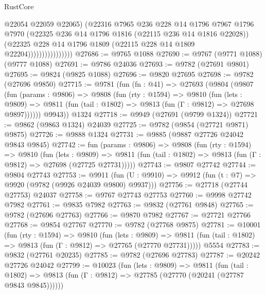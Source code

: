 \begin{lexlean}{RustCore}
\begin{coremodule}
                                @22054
                                @22059
                                @22065)
                              (@22316
                                @7965
                                @236
                                @228
                                @14
                                @1796
                                @7967
                                @1796
                                @7970
                                (@22325 @236 @14 @1796 @1816 (@22115 @236 @14 @1816 @22028))
                                (@22325
                                  @228
                                  @14
                                  @1796
                                  @1809
                                  (@22115 @228 @14 @1809 @22204))))))))))))))))
@27686 := @9765 @1088
@27690 := @9767 (@9771 @1088) (@9777 @1088)
@27691 := @9786 @24036
@27693 := @9782 (@27691 @9801)
@27695 := @9824 (@9825 @1088)
@27696 := @9820 @27695
@27698 := @9782 (@27696 @9850)
@27715 := @9781
    (fun (fn : @41) =>
    @27693
      (@9804
        (@9807
          (fun (params : @9806) =>
          @9808
            (fun (rty : @1594) =>
            @9810
              (fun (lets : @9809) =>
              @9811 (fun (tail : @1802) => @9813 (fun (Γ : @9812) => @27698 @9897))))))
        @9943))
    @1324
@27718 := @9949 (@27691 (@9799 @1324))
@27721 := @9862 (@9863 @1324) @24039
@27725 := @9782 (@9854 (@27721 @9871) @9875)
@27726 := @9888 @1324
@27731 := @9885 (@9887 @27726 @24042 @9843 @9845)
@27742 := fun (params : @9806) =>
  @9808
    (fun (rty : @1594) =>
    @9810
      (fun (lets : @9809) =>
      @9811 (fun (tail : @1802) => @9813 (fun (Γ : @9812) => @27698 (@27725 @27731)))))
@27743 := @9807 @27742
@27744 := @9804 @27743
@27753 := @9911
    (fun (U : @9910) => @9912 (fun (t : @7) => @9920 (@9782 (@9926 @24039 @9800) @9937)))
@27756 := @27718 (@27744 @27753) @24037
@27758 := @9767 @27743 @27753
@27760 := @9998 @27742 @7982
@27761 := @9835 @7982
@27763 := @9832 (@27761 @9848)
@27765 := @9782 (@27696 @27763)
@27766 := @9870 @7982
@27767 := @27721 @27766
@27768 := @9854 @27767
@27770 := @9782 (@27768 @9875)
@27781 := @10001
    (fun (rty : @1594) =>
    @9810
      (fun (lets : @9809) =>
      @9811 (fun (tail : @1802) => @9813 (fun (Γ : @9812) => @27765 (@27770 @27731)))))
    @5554
@27783 := @9832 (@27761 @20235)
@27785 := @9782 (@27696 @27783)
@27787 := @20242 @27726 @24042
@27799 := @10023
    (fun (lets : @9809) =>
    @9811
      (fun (tail : @1802) =>
      @9813 (fun (Γ : @9812) => @27785 (@27770 (@20241 (@27787 @9843 @9845))))))

\end{coremodule}
\end{lexlean}
